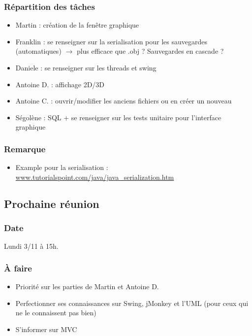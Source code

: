 \documentclass[12pt,a4paper]{article}
\begin{document}
		\subsubsection{Répartition des tâches}
			\begin{itemize}
				\item Martin : création de la fenêtre graphique
				\item Franklin : se renseigner sur la serialisation pour les sauvegardes (automatiques) $\rightarrow$ plus efficace que .obj ? Sauvegardes en cascade ?
				\item Daniele : se renseigner sur les threads et swing
				\item Antoine D. : affichage 2D/3D
				\item Antoine C. : ouvrir/modifier les anciens fichiers ou en créer un nouveau
				\item Ségolène : SQL + se renseigner sur les tests unitaire pour l'interface graphique
			\end{itemize}
		\subsubsection{Remarque}
			\begin{itemize}
				\item Example pour la serialisation : \url{www.tutorialspoint.com/java/java_serialization.htm}
			\end{itemize}
			
		\subsection{Prochaine réunion}
			\subsubsection{Date}
				Lundi 3/11 à 15h.
			\subsubsection{À faire}
				\begin{itemize}
					\item Priorité sur les parties de Martin et Antoine D.
					\item Perfectionner ses connaissances sur Swing, jMonkey et l'UML (pour ceux qui ne le connaissent pas bien)
					\item S'informer sur MVC
				\end{itemize}
			
\newpage
\end{document}
